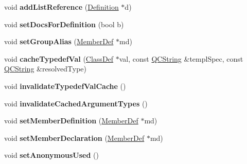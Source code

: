 \begin{DoxyCompactItemize}
\item 
\hypertarget{class_member_def_a688207d19a334955916121b9cb47e953}{void {\bfseries add\-List\-Reference} (\hyperlink{class_definition}{Definition} $\ast$d)}\label{class_member_def_a688207d19a334955916121b9cb47e953}

\item 
\hypertarget{class_member_def_a1375f641b5adf8fc8d3a5a0e1677d64f}{void {\bfseries set\-Docs\-For\-Definition} (bool b)}\label{class_member_def_a1375f641b5adf8fc8d3a5a0e1677d64f}

\item 
\hypertarget{class_member_def_a21912edfa1724fa46419bd10bc833aec}{void {\bfseries set\-Group\-Alias} (\hyperlink{class_member_def}{Member\-Def} $\ast$md)}\label{class_member_def_a21912edfa1724fa46419bd10bc833aec}

\item 
\hypertarget{class_member_def_a97ffab107f298fb19c4162d4ef9853a6}{void {\bfseries cache\-Typedef\-Val} (\hyperlink{class_class_def}{Class\-Def} $\ast$val, const \hyperlink{class_q_c_string}{Q\-C\-String} \&templ\-Spec, const \hyperlink{class_q_c_string}{Q\-C\-String} \&resolved\-Type)}\label{class_member_def_a97ffab107f298fb19c4162d4ef9853a6}

\item 
\hypertarget{class_member_def_a465592f31b1af25a9276fcbc573073c1}{void {\bfseries invalidate\-Typedef\-Val\-Cache} ()}\label{class_member_def_a465592f31b1af25a9276fcbc573073c1}

\item 
\hypertarget{class_member_def_a5ac5f55451786007f15b2332fe144f9e}{void {\bfseries invalidate\-Cached\-Argument\-Types} ()}\label{class_member_def_a5ac5f55451786007f15b2332fe144f9e}

\item 
\hypertarget{class_member_def_abc86464ab08dee8bd0ebe6406d2373d3}{void {\bfseries set\-Member\-Definition} (\hyperlink{class_member_def}{Member\-Def} $\ast$md)}\label{class_member_def_abc86464ab08dee8bd0ebe6406d2373d3}

\item 
\hypertarget{class_member_def_a245fb4454fe5d663c9ba9658f11ab1ef}{void {\bfseries set\-Member\-Declaration} (\hyperlink{class_member_def}{Member\-Def} $\ast$md)}\label{class_member_def_a245fb4454fe5d663c9ba9658f11ab1ef}

\item 
\hypertarget{class_member_def_a3c5df6647cbbd6f7b77490a1a29f3c72}{void {\bfseries set\-Anonymous\-Used} ()}\label{class_member_def_a3c5df6647cbbd6f7b77490a1a29f3c72}


\end{DoxyCompactItemize}
